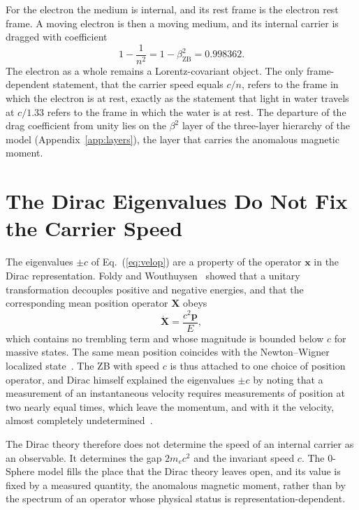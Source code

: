 \documentclass[%
 reprint, amsmath,amssymb, aps, prb, ]{revtex4-2}
\numberwithin{equation}{section}
\begin{document}
For the electron the medium is internal, and its rest frame is the electron rest frame. A moving electron is then a moving medium, and its internal carrier is dragged with coefficient
\begin{equation}
1 - \frac{1}{n^2} = 1 - \beta_{\text{ZB}}^2 = 0.998362.
\label{eq:drag}
\end{equation}
The electron as a whole remains a Lorentz-covariant object. The only frame-dependent statement, that the carrier speed equals $c/n$, refers to the frame in which the electron is at rest, exactly as the statement that light in water travels at $c/1.33$ refers to the frame in which the water is at rest. The departure of the drag coefficient from unity lies on the $\beta^2$ layer of the three-layer hierarchy of the model (Appendix~\ref{app:layers}), the layer that carries the anomalous magnetic moment.

\section{The Dirac Eigenvalues Do Not Fix the Carrier Speed}
\label{sec:fw}

The eigenvalues $\pm c$ of Eq.~(\ref{eq:velop}) are a property of the operator $\bm{x}$ in the Dirac representation. Foldy and Wouthuysen~\cite{FW1950} showed that a unitary transformation decouples positive and negative energies, and that the corresponding mean position operator $\bm{X}$ obeys
\begin{equation}
\dot{\bm{X}} = \frac{c^2\bm{p}}{E},
\label{eq:FW}
\end{equation}
which contains no trembling term and whose magnitude is bounded below $c$ for massive states. The same mean position coincides with the Newton--Wigner localized state~\cite{NW1949}. The ZB with speed $c$ is thus attached to one choice of position operator, and Dirac himself explained the eigenvalues $\pm c$ by noting that a measurement of an instantaneous velocity requires measurements of position at two nearly equal times, which leave the momentum, and with it the velocity, almost completely undetermined~\cite{DiracPrinciples}.

The Dirac theory therefore does not determine the speed of an internal carrier as an observable. It determines the gap $2m_ec^2$ and the invariant speed $c$. The 0-Sphere model fills the place that the Dirac theory leaves open, and its value is fixed by a measured quantity, the anomalous magnetic moment, rather than by the spectrum of an operator whose physical status is representation-dependent.
\end{document}
